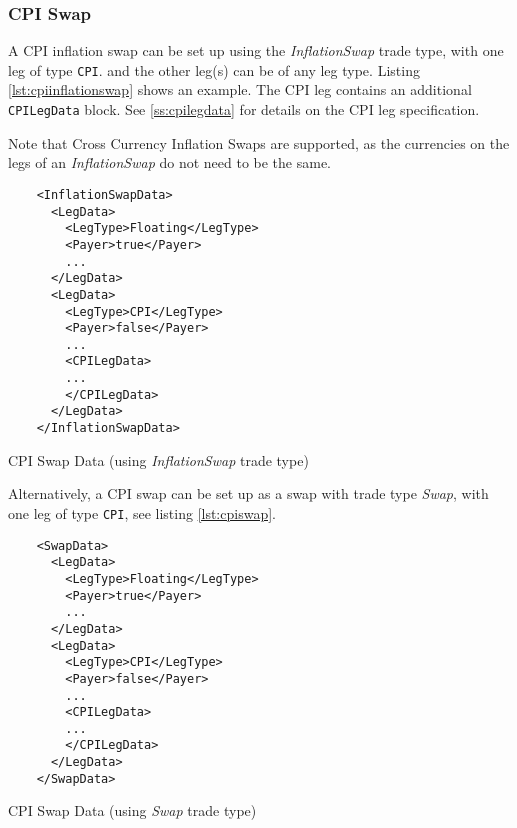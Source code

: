 \subsubsection{CPI Swap}

A CPI inflation swap can be set up using the \emph{InflationSwap} trade type, with one leg of type {\tt CPI}. and the other leg(s) can be of any leg type. Listing \ref{lst:cpiinflationswap} shows an example. The CPI leg contains an additional {\tt CPILegData} block. See \ref{ss:cpilegdata} for details on the
CPI leg specification. 

Note that Cross Currency Inflation Swaps are supported, as the currencies on the legs of an  \emph{InflationSwap} do not need to be the same. 


\begin{listing}[H]
\begin{verbatim}
    <InflationSwapData>
      <LegData>
        <LegType>Floating</LegType>
        <Payer>true</Payer>
        ...
      </LegData>
      <LegData>
        <LegType>CPI</LegType>
        <Payer>false</Payer>
        ...
        <CPILegData>
        ...
        </CPILegData>
      </LegData>
    </InflationSwapData>
\end{verbatim}
\caption{CPI Swap Data (using \emph{InflationSwap} trade type)}
\label{lst:cpiinflationswap}
\end{listing}


Alternatively, a CPI swap can be set up as a swap with trade type \emph{Swap}, with one leg of type {\tt CPI}, see listing \ref{lst:cpiswap}.

\begin{listing}[H]
\begin{verbatim}
    <SwapData>
      <LegData>
        <LegType>Floating</LegType>
        <Payer>true</Payer>
        ...
      </LegData>
      <LegData>
        <LegType>CPI</LegType>
        <Payer>false</Payer>
        ...
        <CPILegData>
        ...
        </CPILegData>
      </LegData>
    </SwapData>
\end{verbatim}
\caption{CPI Swap Data (using \emph{Swap} trade type)}
\label{lst:cpiswap}
\end{listing}

